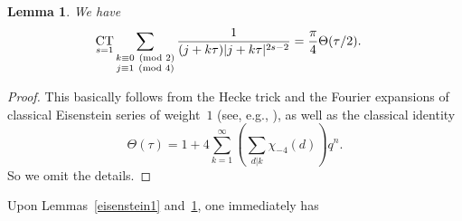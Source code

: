 \documentclass[11pt, reqno]{amsart}
\theoremstyle{plain}
\newtheorem{lemma}[theorem]{Lemma}
\theoremstyle{definition}
\numberwithin{equation}{section}
\begin{document}



\begin{lemma}\label{thetatheta}
   We have 
    \begin{align*} 
    \underset{s=1}{{\rm CT}}\sum_{\substack{k\equiv0\pmod{2}\\j\equiv1\pmod{4}}}\frac{1}{(j+k\tau)|j+k\tau|^{2s-2}}&=\frac{\pi}{4}\Theta(\tau/2).
    \end{align*}
   

\end{lemma}




\begin{proof}
    This basically follows from the Hecke trick \cite{H} and the Fourier expansions of classical Eisenstein series of weight~$1$ (see, e.g., \cite{DS}), as well as the classical identity \cite{J}
    $$
    \Theta(\tau)=1+4\sum_{k=1}^{\infty}\left(\sum_{d|k}\chi_{-4}(d)\right)q^{n}.
    $$
    So we omit the details.
\end{proof}

Upon Lemmas~\ref{eisenstein1} and~\ref{thetatheta}, one immediately has 
\end{document}
